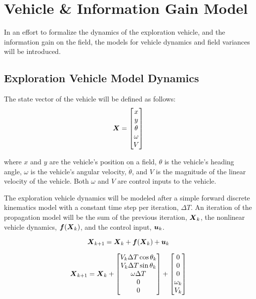 \chapter{Vehicle \& Information Gain Model}
In an effort to formalize the dynamics of the exploration vehicle, and the information gain on the field, the models for vehicle dynamics and field variances will be introduced.

\section{Exploration Vehicle Model Dynamics} \label{sec:vehicledynamics}
The state vector of the vehicle will be defined as follows:
\begin{equation}
{\it{\boldsymbol{X}}} = \begin{bmatrix}
	x \\
	y \\
	\theta \\
	\omega \\
	V
\end{bmatrix}
\label{eq:vehiclemodel}
\end{equation}

\noindent where $x$ and $y$ are the vehicle's position on a field, $\theta$ is the vehicle's heading angle, $\omega$ is the vehicle's angular velocity, $\dot{\theta}$, and $V$ is the magnitude of the linear velocity of the vehicle. Both $\omega$ and $V$ are control inputs to the vehicle.

The exploration vehicle dynamics will be modeled after a simple forward discrete kinematics model with a constant time step per iteration, $\Delta T$. An iteration of the propagation model will be the sum of the previous iteration, ${\it{\boldsymbol{X}}}_{k}$, the nonlinear vehicle dynamics, ${\it{\boldsymbol{f}}}({\it{\boldsymbol{X}}}_k)$, and the control input, ${\it{\boldsymbol{u}}}_k$.

\begin{equation}
	{\it{\boldsymbol{X}}}_{k+1} = {\it{\boldsymbol{X}}}_k + {\it{\boldsymbol{f}}}({\it{\boldsymbol{X}}}_{k}) + {\it{\boldsymbol{u}}}_k
	\label{eq:vehicledynamicsform}
\end{equation}

\begin{equation}
	{\it{\boldsymbol{X}}}_{k+1} = {\it{\boldsymbol{X}}}_k + \begin{bmatrix}
		V_k \Delta T \cos \theta_k \\
		V_k \Delta T \sin \theta_k \\
		\omega \Delta T \\
		0 \\
		0
	\end{bmatrix} + \begin{bmatrix}
	0 \\
	0 \\
	0 \\
	\omega_k \\
	V_k
	\end{bmatrix}
	\label{eq:vehicledynamicsmodel}
\end{equation}

